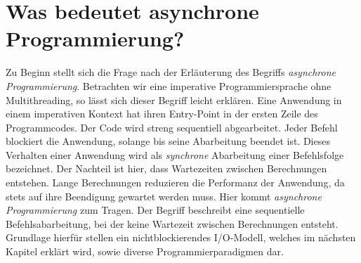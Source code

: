 \section{Was bedeutet asynchrone Programmierung?}
Zu Beginn stellt sich die Frage nach der Erläuterung des Begriffs \textit{asynchrone Programmierung}. Betrachten wir eine imperative Programmiersprache ohne Multithreading, so lässt sich dieser Begriff leicht erklären. Eine Anwendung in einem imperativen Kontext hat ihren Entry-Point in der ersten Zeile des Programmcodes. Der Code wird streng sequentiell abgearbeitet. Jeder Befehl blockiert die Anwendung, solange bis seine Abarbeitung beendet ist. Dieses Verhalten einer Anwendung wird als \textit{synchrone} Abarbeitung einer Befehlsfolge bezeichnet. Der Nachteil ist hier, dass Wartezeiten zwischen Berechnungen entstehen. Lange Berechnungen reduzieren die Performanz der Anwendung, da stets auf ihre Beendigung gewartet werden muss. Hier kommt \textit{asynchrone Programmierung} zum Tragen. Der Begriff beschreibt eine sequentielle Befehlsabarbeitung, bei der keine Wartezeit zwischen Berechnungen entsteht. Grundlage hierfür stellen ein nichtblockierendes I/O-Modell, welches im nächsten Kapitel erklärt wird, sowie diverse Programmierparadigmen dar.
 \acresetall

